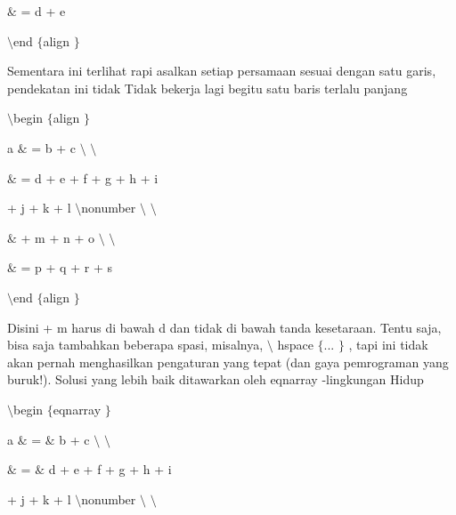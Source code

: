 \vspace{12pt}
\noindent 
 $  \&  $ = d + e \par
\vspace{12pt}
\noindent 
 $  \setminus  $end $  \{  $align $  \}  $ \par
\vspace{12pt}
\noindent 
Sementara ini terlihat rapi asalkan setiap persamaan sesuai dengan satu garis, pendekatan ini tidak Tidak bekerja lagi begitu satu baris terlalu panjang \par
\noindent 
 $  \setminus  $begin $  \{  $align $  \}  $ \par
\vspace{12pt}
\noindent 
a  $  \&  $ = b + c  $  \setminus  $ $  \setminus  $ \par
\vspace{12pt}
\noindent 
 $  \&  $ = d + e + f + g + h + i \par
\noindent 
  \par
\noindent 
+ j + k + l  $  \setminus  $nonumber $  \setminus  $ $  \setminus  $ \par
\vspace{12pt}
\noindent 
 $  \&  $ + m + n + o  $  \setminus  $ $  \setminus  $ \par
\vspace{12pt}
\noindent 
 $  \&  $ = p + q + r + s \par
\vspace{12pt}
\noindent 
 $  \setminus  $end $  \{  $align $  \}  $ \par
\vspace{12pt}
\noindent 
Disini + m harus di bawah d dan tidak di bawah tanda kesetaraan. Tentu saja, bisa saja tambahkan beberapa spasi, misalnya,  $  \setminus  $ hspace  $  \{  $... $  \}  $ , tapi ini tidak akan pernah menghasilkan pengaturan yang tepat (dan gaya pemrograman yang buruk!). Solusi yang lebih baik ditawarkan oleh eqnarray -lingkungan Hidup \par
\vspace{12pt}
\noindent 
 $  \setminus  $begin $  \{  $eqnarray $  \}  $ \par
\vspace{12pt}
\noindent 
a  $  \&  $ =  $  \&  $ b + c  $  \setminus  $ $  \setminus  $ \par
\vspace{12pt}
\noindent 
 $  \&  $ =  $  \&  $ d + e + f + g + h + i \par
\vspace{12pt}
\noindent 
+ j + k + l  $  \setminus  $nonumber $  \setminus  $ $  \setminus  $ \par

